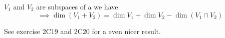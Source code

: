 \begin{thm} 
  \label{dimension of a sum}
  $V_1$ and $V_2$ are subspaces of a \fdvs we have
  \begin{equation}
    \implies \dim (V_1 + V_2) = \dim V_1 + \dim V_2 - \dim (V_1 \cap V_2)
  \end{equation}

  See exercise 2C19 and 2C20 for a even nicer result.
%
%
\end{thm}

